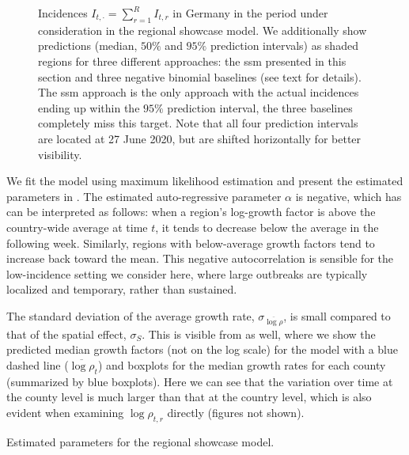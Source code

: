 \begin{figure}
    \resizebox{\textwidth}{!}{%
    }
    \caption{Incidences $I_{t,\cdot} = \sum_{r = 1}^R I_{t,r}$ in Germany in the period under consideration in the regional showcase model. We additionally show predictions (median, $50\%$ and $95\%$ prediction intervals) as shaded regions for three different approaches: the \acrshort{ssm} presented in this section and three negative binomial baselines (see text for details). The \acrshort{ssm} approach is the only approach with the actual incidences ending up within the $95\%$ prediction interval, the three baselines completely miss this target. Note that all four prediction intervals are located at 27 June 2020, but are shifted horizontally for better visibility.}
    \label{fig:regional_showcase_prediction}
\end{figure}

We fit the model using maximum likelihood estimation and present the estimated parameters in . 
The estimated auto-regressive parameter $\alpha$ is negative, which has can be interpreted as follows: when a region's log-growth factor is above the country-wide average at time $t$, it tends to decrease below the average in the following week. Similarly, regions with below-average growth factors tend to increase back toward the mean. This negative autocorrelation is sensible for the low-incidence setting we consider here, where large outbreaks are typically localized and temporary, rather than sustained.

The standard deviation of the average growth rate, $\sigma_{\overline{\log \rho}}$, is small compared to that of the spatial effect, $\sigma_{S}$. This is visible from  as well, where we show the predicted median growth factors (not on the log scale) for the model with a blue dashed line ($\overline{\log \rho}_{t}$) and boxplots for the median growth rates for each county (summarized by blue boxplots). Here we can see that the variation over time at the county level is much larger than that at the country level, which is also evident when examining $\log \rho_{t,r}$ directly (figures not shown).

\begin{table}
    \centering
    
    \caption{Estimated parameters for the regional showcase model.}
    \label{tab:regional_showcase_theta}
\end{table}


